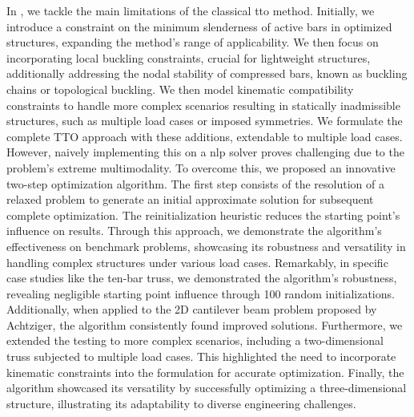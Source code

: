 In , we tackle the main limitations of the classical \gls{tto} method. Initially, we introduce a constraint on the minimum slenderness of active bars in optimized structures, expanding the method's range of applicability. We then focus on incorporating local buckling constraints, crucial for lightweight structures, additionally addressing the nodal stability of compressed bars, known as buckling chains or topological buckling. We then model kinematic compatibility constraints to handle more complex scenarios resulting in statically inadmissible structures, such as multiple load cases or imposed symmetries. We formulate the complete TTO approach with these additions, extendable to multiple load cases. However, naively implementing this on a \gls{nlp} solver proves challenging due to the problem's extreme multimodality. To overcome this, we proposed an innovative two-step optimization algorithm. The first step consists of the resolution of a relaxed problem to generate an initial approximate solution for subsequent complete optimization. The reinitialization heuristic reduces the starting point's influence on results. Through this approach, we demonstrate the algorithm's effectiveness on benchmark problems, showcasing its robustness and versatility in handling complex structures under various load cases. Remarkably, in specific case studies like the ten-bar truss, we demonstrated the algorithm's robustness, revealing negligible starting point influence through 100 random initializations. Additionally, when applied to the 2D cantilever beam problem proposed by Achtziger, the algorithm consistently found improved solutions. Furthermore, we extended the testing to more complex scenarios, including a two-dimensional truss subjected to multiple load cases. This highlighted the need to incorporate kinematic constraints into the formulation for accurate optimization. Finally, the algorithm showcased its versatility by successfully optimizing a three-dimensional structure, illustrating its adaptability to diverse engineering challenges.


